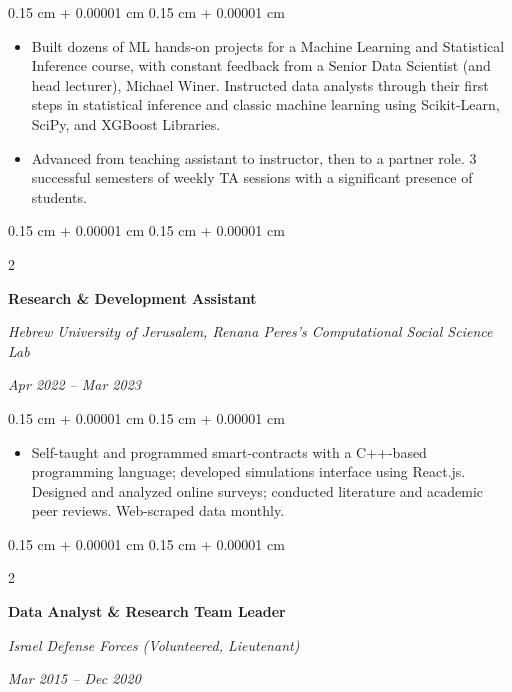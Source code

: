 \documentclass[10pt, letterpaper]{article}
\newenvironment{highlights}{
    \begin{itemize}[
        topsep=0.08 cm,
        parsep=0.08 cm,
        partopsep=0pt,
        itemsep=0pt,
        leftmargin=0.25 cm + 10pt
    ]
}{
    \end{itemize}
} %
\newenvironment{onecolentry}{
    \begin{adjustwidth}{
        0.15 cm + 0.00001 cm
    }{
        0.15 cm + 0.00001 cm
    }
}{
    \end{adjustwidth}
} %
\newenvironment{twocolentry}[2][]{
    \onecolentry
    \def\secondColumn{#2}
    \setcolumnwidth{\fill, 4.5 cm}
    \begin{paracol}{2}
}{
    \switchcolumn \raggedleft \secondColumn
    \end{paracol}
    \endonecolentry
} %
\begin{document}
        \vspace{0.08 cm}
        \begin{onecolentry}
            \begin{highlights}
                \item Built dozens of ML hands-on projects for a Machine Learning and Statistical Inference course, with constant feedback from a Senior Data Scientist (and head lecturer), Michael Winer. Instructed data analysts through their first steps in statistical inference and classic machine learning using Scikit-Learn, SciPy, and XGBoost Libraries.
                \item Advanced from teaching assistant to instructor, then to a partner role. 3 successful semesters of weekly TA sessions with a significant presence of students.
            \end{highlights}
        \end{onecolentry}


        \vspace{0.15 cm}

        \begin{twocolentry}{
            
            
        \textit{Apr 2022 – Mar 2023}}
            \textbf{Research \& Development Assistant}
            
            \textit{Hebrew University of Jerusalem, Renana Peres's Computational Social Science Lab}
        \end{twocolentry}

        \vspace{0.08 cm}
        \begin{onecolentry}
            \begin{highlights}
                \item Self-taught and programmed smart-contracts with a C++-based programming language; developed simulations interface using React.js. Designed and analyzed online surveys; conducted literature and academic peer reviews. Web-scraped data monthly.
            \end{highlights}
        \end{onecolentry}


        \vspace{0.15 cm}

        \begin{twocolentry}{
            
            
        \textit{Mar 2015 – Dec 2020}}
            \textbf{Data Analyst \& Research Team Leader}
            
            \textit{Israel Defense Forces (Volunteered, Lieutenant)}
        \end{twocolentry}
\end{document}
